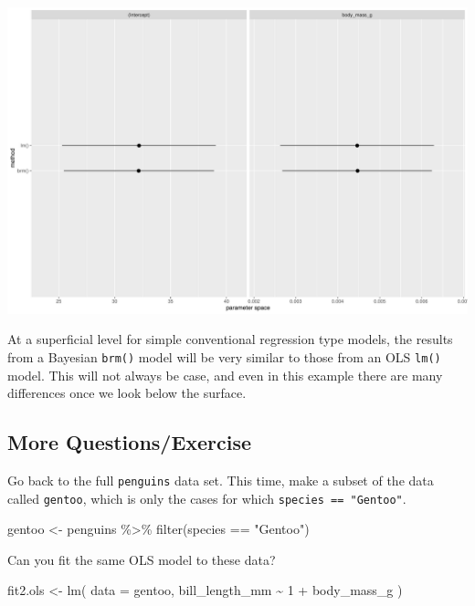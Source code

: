 \documentclass[
  letterpaper,
  DIV=11,
  numbers=noendperiod]{scrartcl}
\newenvironment{Shaded}{\begin{snugshade}}{\end{snugshade}}
\newcommand{\AttributeTok}[1]{\textcolor[rgb]{0.40,0.45,0.13}{#1}}
\newcommand{\DecValTok}[1]{\textcolor[rgb]{0.68,0.00,0.00}{#1}}
\newcommand{\FunctionTok}[1]{\textcolor[rgb]{0.28,0.35,0.67}{#1}}
\newcommand{\NormalTok}[1]{\textcolor[rgb]{0.00,0.23,0.31}{#1}}
\newcommand{\OtherTok}[1]{\textcolor[rgb]{0.00,0.23,0.31}{#1}}
\newcommand{\SpecialCharTok}[1]{\textcolor[rgb]{0.37,0.37,0.37}{#1}}
\newcommand{\StringTok}[1]{\textcolor[rgb]{0.13,0.47,0.30}{#1}}
\begin{document}
\includegraphics{Bayes_Lab_1_files/figure-pdf/unnamed-chunk-26-1.pdf}

At a superficial level for simple conventional regression type models,
the results from a Bayesian \texttt{brm()} model will be very similar to
those from an OLS \texttt{lm()} model. This will not always be case, and
even in this example there are many differences once we look below the
surface.

\subsection{More Questions/Exercise}\label{more-questionsexercise}

Go back to the full \texttt{penguins} data set. This time, make a subset
of the data called \texttt{gentoo}, which is only the cases for which
\texttt{species\ ==\ "Gentoo"}.

\begin{Shaded}
\begin{Highlighting}[]
\NormalTok{gentoo }\OtherTok{\textless{}{-}}\NormalTok{ penguins }\SpecialCharTok{\%\textgreater{}\%} 
  \FunctionTok{filter}\NormalTok{(species }\SpecialCharTok{==} \StringTok{"Gentoo"}\NormalTok{)}
\end{Highlighting}
\end{Shaded}

Can you fit the same OLS model to these data?

\begin{Shaded}
\begin{Highlighting}[]
\NormalTok{fit2.ols }\OtherTok{\textless{}{-}} \FunctionTok{lm}\NormalTok{(}
  \AttributeTok{data =}\NormalTok{ gentoo,}
\NormalTok{  bill\_length\_mm }\SpecialCharTok{\textasciitilde{}} \DecValTok{1} \SpecialCharTok{+}\NormalTok{ body\_mass\_g}
\NormalTok{)}
\end{Highlighting}
\end{Shaded}
\end{document}
